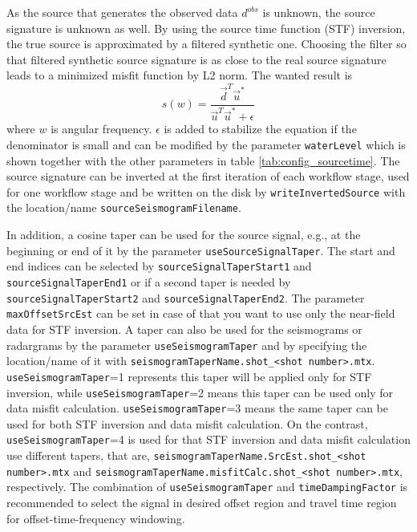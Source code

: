 \documentclass[pdftex,a4paper,parskip,listof=totoc,bibliography=totoc,onehalfspacing,12pt]{scrreprt}
\begin{document}
As the source that generates the observed data $d^{obs}$ is unknown, the source signature is unknown as well. By using the source time function (STF) inversion, the true source is approximated by a filtered synthetic one. Choosing the filter so that filtered synthetic source signature is as close to the real source signature leads to a minimized misfit function by L2 norm. The wanted result is 
\begin{equation*}
 s(w)=\dfrac{\vec{d}^T\vec{u}^*}{\vec{u}^T\vec{u}^*+\epsilon}
\end{equation*}
where $w$ is angular frequency. $\epsilon$ is added to stabilize the equation if the denominator is small and can be modified by the parameter \verb+waterLevel+ which is shown together with the other parameters in table \ref{tab:config_sourcetime}. The source signature can be inverted at the first iteration of each workflow stage, used for one workflow stage and be written on the disk by \verb+writeInvertedSource+ with the location/name \verb+sourceSeismogramFilename+.

In addition, a cosine taper can be used for the source signal, e.g., at the beginning or end of it by the parameter \verb+useSourceSignalTaper+. The start and end indices can be selected by \verb+sourceSignalTaperStart1+ and \verb+sourceSignalTaperEnd1+ or if a second taper is needed by \verb+sourceSignalTaperStart2+ and \verb+sourceSignalTaperEnd2+. The parameter \verb+maxOffsetSrcEst+ can be set in case of that you want to use only the near-field data for STF inversion.
A taper can also be used for the seismograms or radargrams by the parameter \verb+useSeismogramTaper+ and by specifying the location/name of it with \verb+seismogramTaperName.shot_<shot number>.mtx+. \verb+useSeismogramTaper+=1 represents this taper will be applied only for STF inversion, while \verb+useSeismogramTaper+=2 means this taper can be used only for data misfit calculation. \verb+useSeismogramTaper+=3 means the same taper can be used for both STF inversion and data misfit calculation.  On the contrast, \verb+useSeismogramTaper+=4 is used for that STF inversion and data misfit calculation use different tapers, that are,  \verb+seismogramTaperName.SrcEst.shot_<shot number>.mtx+ and \verb+seismogramTaperName.misfitCalc.shot_<shot number>.mtx+, respectively. The combination of \verb+useSeismogramTaper+ and \verb+timeDampingFactor+ is recommended to select the signal in desired offset region and travel time region for offset-time-frequency windowing.
\end{document}
